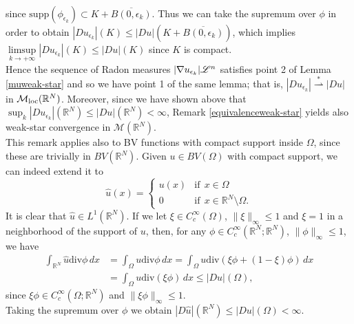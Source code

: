 \begin{remark}
\begin{align*}
\end{align*}
since $\mathrm{supp}(\phi_{\epsilon_{k}}) \subset K + \overline{B(0, \epsilon_{k})}$. Thus we can take the supremum over $\phi$ in order to obtain $|D u_{\epsilon_{k}}|(K) \le |D u|(K + \overline{B(0, \epsilon_{k})})$, which implies $\limsup \limits_{k \to + \infty} |D u_{\epsilon_{k}}|(K) \le |D u|(K)$ since $K$ is compact.
\\
Hence the sequence of Radon measures $|\nabla u_{\epsilon_{k}}| \mathscr{L}^{n}$ satisfies point 2 of Lemma \ref{muweak-star} and so we have point 1 of the same lemma; that is, $|D u_{\epsilon_{k}}| \stackrel {*}{\rightharpoonup} |Du|$ in $\mathcal{M}_{\rm loc}(\mathbb{R}^{N})$. Moreover, since we have shown above that $\sup_{k} |Du_{\epsilon_{k}}|(\mathbb{R}^{N}) \le |Du|(\mathbb{R}^{N}) < \infty$, Remark \ref{equivalenceweak-star} yields also weak-star convergence in $\mathcal{M}(\mathbb{R}^{N})$.
\\

This remark applies also to BV functions with compact support inside $\Omega$, since these are trivially in $BV(\mathbb{R}^{N})$. Given $u \in BV(\Omega)$ with compact support, we can indeed extend it to 
\[ \hat{u}(x) = \begin{cases} u(x) & \mbox{if} \ \ x \in \Omega \\ 0 & \mbox{if} \ \ x \in \mathbb{R}^{N} \setminus \Omega. \end{cases} \]
It is clear that $\hat{u} \in L^{1}(\mathbb{R}^{N})$. If we let $\xi \in C^{\infty}_{c}(\Omega)$, $\|\xi\|_{\infty} \le 1$ and $\xi = 1$ in a neighborhood of the support of $u$, then, for any $\phi \in C^{\infty}_{c}(\mathbb{R}^{N}; \mathbb{R}^{N})$, $\|\phi\|_{\infty} \le 1$, we have
\begin{align*} \int_{\mathbb{R}^{N}} \hat{u} \mathrm{div}\phi \, dx & = \int_{\Omega} u \mathrm{div}\phi \, dx = \int_{\Omega} u \mathrm{div}(\xi \phi + (1 - \xi) \phi) \, dx \\
& = \int_{\Omega} u \mathrm{div}(\xi \phi) \, dx \le |Du|(\Omega), 
\end{align*}
since $\xi \phi \in C^{\infty}_{c}(\Omega; \mathbb{R}^{N})$ and $\|\xi \phi\|_{\infty} \le 1$. 
\\
Taking the supremum over $\phi$ we obtain $|D \hat{u}|(\mathbb{R}^{N}) \le |Du|(\Omega) < \infty$.
\end{remark}


